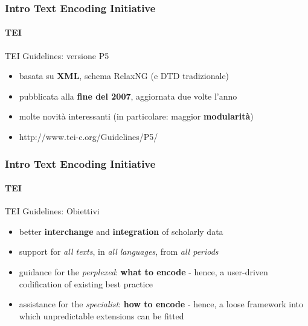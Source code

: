 


    

\begin{frame}
	\frametitle{Intro Text Encoding Initiative}
	\framesubtitle{TEI}
	\addtocounter{nframe}{1}

	\begin{block}{TEI Guidelines: versione P5}
		\begin{itemize}
			\item basata su \textbf{XML}, schema RelaxNG (e DTD tradizionale)
			\item pubblicata alla \textbf{fine del 2007}, aggiornata due volte l’anno
			\item molte novità interessanti (in particolare: maggior \textbf{modularità})
			\item  http://www.tei-c.org/Guidelines/P5/
		\end{itemize}
	\end{block}

\end{frame}

\begin{frame}
	\frametitle{Intro Text Encoding Initiative}
	\framesubtitle{TEI}
	\addtocounter{nframe}{1}

	\begin{block}{TEI Guidelines: Obiettivi}
		\begin{itemize}
			\item better \textbf{interchange} and \textbf{integration} of scholarly data
			\item support for \textit{all texts}, in \textit{all languages}, from \textit{all periods}
			\item guidance for the \textit{perplexed}: \textbf{what to encode} - hence, a user-driven codification of existing best practice
			\item assistance for the \textit{specialist}: \textbf{how to encode} - hence, a loose framework into which unpredictable extensions can be fitted
		\end{itemize}
	\end{block}

\end{frame}



